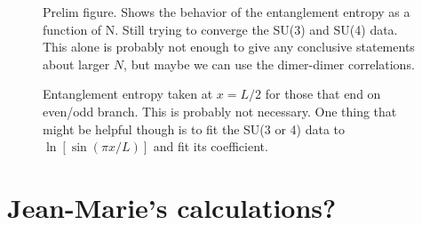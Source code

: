 \documentclass{article}
\begin{document}
%
%
\begin{figure}[h]
	\begin{center}
	\end{center}
	\caption{Prelim figure. Shows the behavior of the entanglement entropy as a function of N. Still trying to converge the SU(3) and SU(4) data. This alone is probably
			not enough to give any conclusive statements about larger $N$, but maybe we can use the dimer-dimer correlations.}
	\label{fig:L24}
\end{figure}
%

%
\begin{figure}[h]
	\begin{center}
	\end{center}
	\caption{Entanglement entropy taken at $x = L/2$ for those that end on even/odd branch. This is probably not necessary. One thing that might be helpful though is to 
			fit the SU(3 or 4) data to $\ln\left[ \sin( \pi x/L ) \right]$ and fit its coefficient.}
	\label{fig:halfwidth}
\end{figure}
%

\section{Jean-Marie's calculations?}
\end{document}
